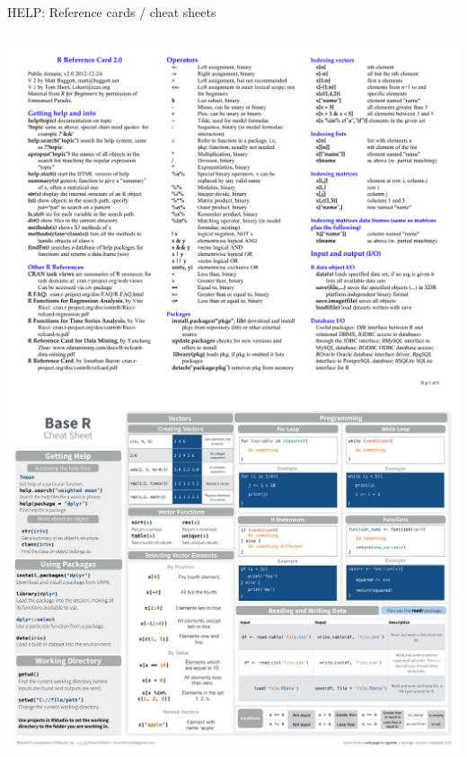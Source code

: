 \documentclass[
  11pt,
  ignorenonframetext,
]{beamer}
\begin{document}
\begin{frame}{HELP: Reference cards / cheat sheets}
\begin{columns}[c,onlytextwidth]
\begin{column}{0.4\textwidth}
\href{https://cran.r-project.org/doc/contrib/Baggott-refcard-v2.pdf}{\includegraphics{images/Baggott-refcard-v2.pdf}}
\href{https://github.com/rstudio/cheatsheets/blob/main/base-r.pdf}{\includegraphics{images/base-r.pdf}}
\end{column}
\end{columns}

\end{frame}
\end{document}
